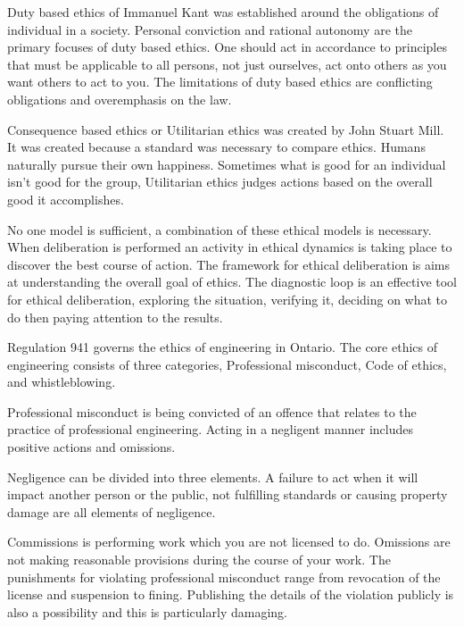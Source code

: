 \documentclass[12pt,a4paper]{report}
\begin{document}
    Duty based ethics of Immanuel Kant was established around the obligations of individual in a society. Personal conviction and rational autonomy are the primary focuses of duty based ethics. One should act in accordance to principles that must be applicable to all persons, not just ourselves, act onto others as you want others to act to you. The limitations of duty based ethics are conflicting obligations and overemphasis on the law.  \par
    
    Consequence based ethics or Utilitarian ethics was created by John Stuart Mill. It was created because a standard was necessary to compare ethics. Humans naturally pursue their own happiness. Sometimes what is good for an individual isn’t good for the group, Utilitarian ethics judges actions based on the overall good it accomplishes. \par
    
    No one model is sufficient, a combination of these ethical models is necessary. When deliberation is performed an activity in ethical dynamics is taking place to discover the best course of action. The framework for ethical deliberation is aims at understanding the overall goal of ethics. The diagnostic loop is an effective tool for ethical deliberation, exploring the situation, verifying it, deciding on what to do then paying attention to the results. \par
    
    
    Regulation 941 governs the ethics of engineering in Ontario. The core ethics of engineering consists of three categories, Professional misconduct, Code of ethics, and whistleblowing. 
    \par
    
    Professional misconduct is being convicted of an offence that relates to the practice of professional engineering. Acting in a negligent manner includes positive actions and omissions. \par
    
    Negligence can be divided into three elements. A failure to act when it will impact another person or the public, not fulfilling standards or causing property damage are all elements of negligence.
    \par
    
    Commissions is performing work which you are not licensed to do. Omissions are not making reasonable provisions during the course of your work. The punishments for violating professional misconduct range from revocation of the license and suspension to fining. Publishing the details of the violation publicly is also a possibility and this is particularly damaging. \par
    
\end{document}
